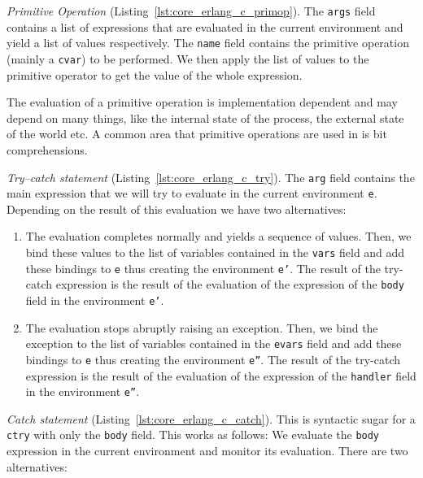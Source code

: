 \emph{Primitive Operation} (Listing~\ref{lst:core_erlang_c_primop}).
The \texttt{args} field contains a list of expressions that are evaluated in the current
environment and yield a list of values respectively. The \texttt{name} field contains
the primitive operation (mainly a \texttt{c\textunderscore var}) to be performed. We then apply the
list of values to the primitive operator to get the value of the whole
expression.

The evaluation of a primitive operation is implementation dependent and may
depend on many things, like the internal state of the process, the external
state of the world etc. A common area that primitive operations are used in is
bit comprehensions.


\emph{Try–catch statement} (Listing~\ref{lst:core_erlang_c_try}).
The \texttt{arg} field contains the main expression that we will try to evaluate
in the current environment \texttt{e}. Depending on the result of this
evaluation we have two alternatives:

\begin{enumerate}
  \item The evaluation completes normally and yields a sequence of values.
    Then, we bind these values to the list of variables contained in the
    \texttt{vars} field and add these bindings to \texttt{e} thus creating the
    environment \texttt{e'}. The result of the try-catch expression is the result of the evaluation of the expression of the \texttt{body} field in the environment \texttt{e'}.
  \item The evaluation stops abruptly raising an exception. Then, we bind the
    exception to the list of variables contained in the \texttt{evars} field
    and add these bindings to \texttt{e} thus creating the environment
    \texttt{e''}. The result of the try-catch expression is the result of the evaluation of the expression of the \texttt{handler} field in the environment \texttt{e''}.
\end{enumerate}



\emph{Catch statement} (Listing~\ref{lst:core_erlang_c_catch}).
This is syntactic sugar for a \texttt{c\textunderscore try} with only the \texttt{body} field. This works as follows:
We evaluate the \texttt{body} expression in the current environment and monitor its evaluation. There are two alternatives:


